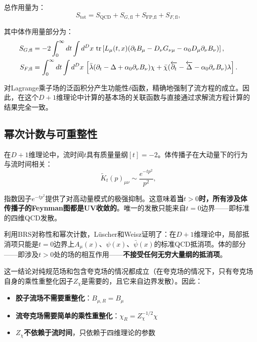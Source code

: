 \documentclass[12pt,a4paper]{ctexart}
\theoremstyle{definition}
\begin{document}
总作用量为\cite{Luscher2013}：
\begin{equation}
S_{\text{tot}} = S_{\text{QCD}} + S_{G,\text{fl}} + S_{\text{FP},\text{fl}} + S_{F,\text{fl}},
\label{eq:Stot}
\end{equation}

其中体作用量部分为：
\begin{align}
S_{G,\text{fl}} &= -2 \int_0^\infty dt \int d^D x \, \tr \left[ L_\mu(t,x) (\partial_t B_\mu - D_\nu G_{\nu\mu} - \alpha_0 D_\mu \partial_\nu B_\nu) \right], \\
S_{F,\text{fl}} &= \int_0^\infty dt \int d^D x \, \left[ \bar{\lambda}(\partial_t - \Delta + \alpha_0 \partial_\nu B_\nu)\chi + \bar{\chi}(\overleftarrow{\partial_t} - \overleftarrow{\Delta} - \alpha_0 \partial_\nu B_\nu)\lambda \right].
\end{align}

对Lagrange乘子场的泛函积分产生功能性$\delta$函数，精确地强制了流方程的成立。因此，在这个$D+1$维理论中计算的基本场的关联函数与直接通过求解流方程计算的结果完全一致。

\subsection{幂次计数与可重整性}

在$D+1$维理论中，流时间$t$具有质量量纲$[t] = -2$。体传播子在大动量下的行为与流时间相关：
\begin{equation}
\tilde{K}_t(p)_{\mu\nu} \sim \frac{e^{-tp^2}}{p^2},
\label{eq:propagator_behavior}
\end{equation}

指数因子$e^{-tp^2}$提供了对高动量模式的极强抑制。这意味着\textbf{当$t>0$时，所有涉及体传播子的Feynman图都是UV收敛的}。唯一的发散只能来自$t=0$边界——即标准的四维QCD发散。

利用BRS对称性和幂次计数，L\"uscher和Weisz证明了\cite{LuscherWeisz2011}：在$D+1$维理论中，局部抵消项只能是$t=0$边界上$A_\mu(x)$、$\psi(x)$、$\bar{\psi}(x)$的标准QCD抵消项。体的部分——即涉及$t>0$处的场的相互作用——\textbf{不接受任何无穷大量纲的抵消项}。

这一结论对纯规范场和包含夸克场的情况都成立（在夸克场的情况下，只有夸克场自身的乘性重整化因子$Z_\chi$是需要的，且它来自边界发散）\cite{Luscher2013}。因此：
\begin{itemize}
    \item \textbf{胶子流场不需要重整化}：$B_{\mu,R} = B_\mu$
    \item \textbf{流夸克场需要简单的乘性重整化}：$\chi_R = Z_\chi^{-1/2}\chi$
    \item $Z_\chi$\textbf{不依赖于流时间}，只依赖于四维理论的参数
\end{itemize}
\end{document}
